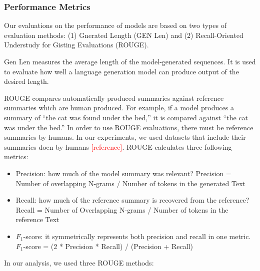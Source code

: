 \subsubsection{Performance Metrics}


Our evaluations on the performance of models are based on two types of evaluation methods: (1) Gnerated Length (GEN Len) and (2) Recall-Oriented Understudy for Gisting Evaluations (ROUGE).


 Gen Len measures the average length of the model-generated sequences. It is used to evaluate how well a language generation model can produce output of the desired length.

ROUGE compares automatically produced summaries against reference summaries which are human produced. For example, if a model produces a summary of ``the cat was found under the bed,” it is compared against ``the cat was under the bed.” In order to use ROUGE evaluations, there must be reference summaries by humans. In our experiments, we used datasets that include their summaries doen by humans \textcolor{red}{[reference]}.
ROUGE calculates three following metrics: %

\begin{itemize}
	
	\item Precision: how much of the model summary was relevant? Precision = Number of overlapping N-grams / Number of tokens in the generated Text
	
	\item Recall: how much of the reference summary is recovered from the reference? Recall = Number of Overlapping N-grams / Number of tokens in the reference Text
	
	\item $F_1$-score: it symmetrically represents both precision and recall in one metric. $F_1$-score = (2 * Precision * Recall) / (Precision + Recall)
	
\end{itemize}

In our analysis, we used three ROUGE methods:

